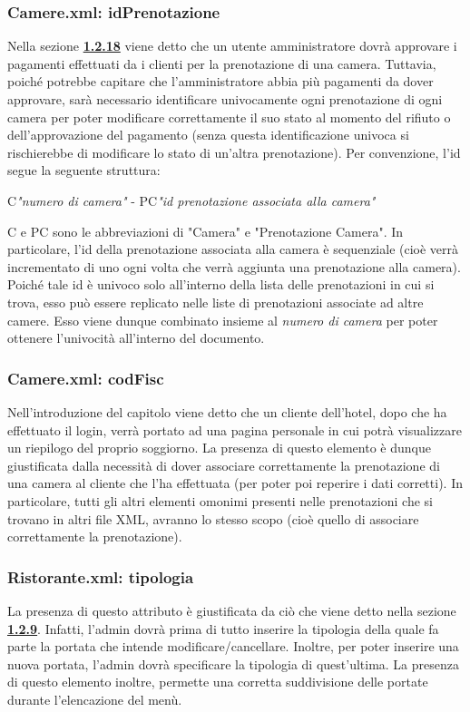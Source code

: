 \documentclass [a4paper, 12pt]{book}
\begin{document}
\subsubsection{Camere.xml: idPrenotazione}
Nella sezione \hyperref[ApprovazionePagamento]{\textbf{1.2.18}} viene detto che un utente amministratore dovrà approvare i pagamenti effettuati da i clienti per la prenotazione di una camera. Tuttavia, poiché potrebbe capitare che l'amministratore abbia più pagamenti da dover approvare, sarà necessario identificare univocamente ogni prenotazione di ogni camera per poter modificare correttamente il suo stato al momento del rifiuto o dell'approvazione del pagamento (senza questa identificazione univoca si rischierebbe di modificare lo stato di un'altra prenotazione). Per convenzione, l'id segue la seguente struttura:
\begin{center}
C\textit{"numero di camera"} - PC\textit{"id prenotazione associata alla camera"}
\end{center}
C e PC sono le abbreviazioni di "Camera" e "Prenotazione Camera". In particolare, l'id della prenotazione associata alla camera è sequenziale (cioè verrà incrementato di uno ogni volta che verrà aggiunta una prenotazione alla camera). Poiché tale id è univoco solo all'interno della lista delle prenotazioni in cui si trova, esso può essere replicato nelle liste di prenotazioni associate ad altre camere. Esso viene dunque combinato insieme al \textit{numero di camera} per poter ottenere l'univocità all'interno del documento.

\subsubsection{Camere.xml: codFisc}
Nell'introduzione del capitolo viene detto che un cliente dell'hotel, dopo che ha effettuato il login, verrà portato ad una pagina personale in cui potrà visualizzare un riepilogo del proprio soggiorno. La presenza di questo elemento è dunque giustificata dalla necessità di dover associare correttamente la prenotazione di una camera al cliente che l'ha effettuata (per poter poi reperire i dati corretti). In particolare, tutti gli altri elementi omonimi presenti nelle prenotazioni che si trovano in altri file XML, avranno lo stesso scopo (cioè quello di associare correttamente la prenotazione).

\subsubsection{Ristorante.xml: tipologia}
La presenza di questo attributo è giustificata da ciò che viene detto nella sezione \hyperref[ModificaMenu]{\textbf{1.2.9}}. Infatti, l'admin dovrà prima di tutto inserire la tipologia della quale fa parte la portata che intende modificare/cancellare. Inoltre, per poter inserire una nuova portata, l'admin dovrà specificare la tipologia di quest'ultima. La presenza di questo elemento inoltre, permette una corretta suddivisione delle portate durante l'elencazione del menù.
\end{document}
